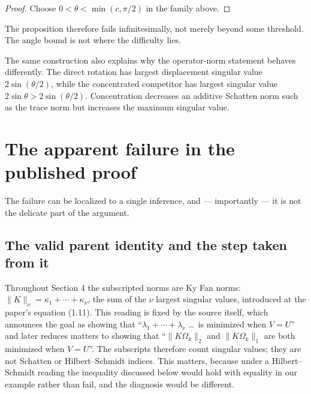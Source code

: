 \documentclass[11pt]{article}
\theoremstyle{definition}
\begin{document}
\begin{proof}
Choose $0<\theta<\min(c,\pi/2)$ in the family above.
\end{proof}

The proposition therefore fails infinitesimally, not merely beyond some
threshold.  The angle bound is not where the difficulty lies.

The same construction also explains why the operator-norm statement behaves
differently.  The direct rotation has largest displacement singular value
$2\sin(\theta/2)$, while the concentrated competitor has largest singular value
$2\sin\theta>2\sin(\theta/2)$.  Concentration decreases an additive Schatten
norm such as the trace norm but increases the maximum singular value.

\section{The apparent failure in the published proof}
\label{sec:proofgap}

The failure can be localized to a single inference, and — importantly — it is
not the delicate part of the argument.

\subsection{The valid parent identity and the step taken from it}

Throughout Section 4 the subscripted norms are Ky Fan norms:
$\lVert K\rVert_\nu=\kappa_1+\cdots+\kappa_\nu$, the sum of the $\nu$ largest
singular values, introduced at the paper's equation (1.11).  This reading is
fixed by the source itself, which announces the goal as showing that
``$\lambda_1+\cdots+\lambda_\nu$ \dots\ is minimized when $V=U$'' and later
reduces matters to showing that ``$\lVert K\Omega_k\rVert_2$ and
$\lVert K\Omega_k\rVert_1$ are both minimized when $V=U$''.  The subscripts
therefore count singular values; they are not Schatten or Hilbert--Schmidt
indices.  This matters, because under a Hilbert--Schmidt reading the inequality
discussed below would hold with equality in our example rather than fail, and
the diagnosis would be different.
\end{document}
